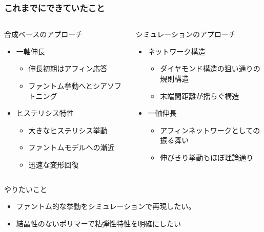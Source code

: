 \documentclass[11pt, dvipdfmx]{beamer}
\begin{document}
\begin{frame}
\frametitle{これまでにできていたこと}
\begin{columns}[totalwidth=1\textwidth]
\begin{block}{合成ベースのアプローチ}
\begin{itemize}
\item
一軸伸長
	\begin{itemize}
	\item
	伸長初期はアフィン応答
	\item
	ファントム挙動へとシアソフトニング
	\end{itemize}
\item
ヒステリシス特性
	\begin{itemize}
	\item
	大きなヒステリシス挙動
	\item
	ファントムモデルへの漸近
	\item
	迅速な変形回復
	\end{itemize}
\end{itemize}
\end{block}

\begin{block}{シミュレーションのアプローチ}
\begin{itemize}
\item
ネットワーク構造
	\begin{itemize}
	\item
	ダイヤモンド構造の狙い通りの規則構造
	\item
	末端間距離が揺らぐ構造
	\end{itemize}
\item
一軸伸長
	\begin{itemize}
	\item
	アフィンネットワークとしての振る舞い
	\item
	伸びきり挙動もほぼ理論通り
	\end{itemize}
\end{itemize}
\end{block}
\end{columns}

\begin{alertblock}{やりたいこと}
\begin{itemize}
\item
ファントム的な挙動をシミュレーションで再現したい。
\item
結晶性のないポリマーで粘弾性特性を明確にしたい
\end{itemize}
\end{alertblock}
\end{frame}
\end{document}
